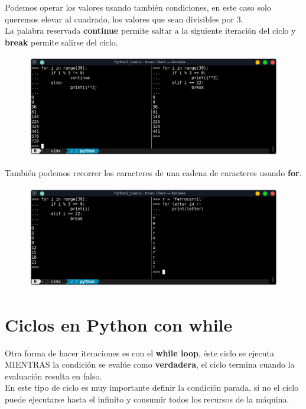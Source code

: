 \documentclass{article}
\begin{document}
Podemos operar los valores usando también condiciones, en este caso solo
queremos elevar al cuadrado, los valores que sean divisibles por 3.\\

La palabra reservada \textbf{continue} permite saltar a la siguiente iteración
del ciclo y \textbf{break} permite salirse del ciclo.

\begin{figure}[h!]
  \centering
  \includegraphics[scale=0.75]{./Pictures/021_for.png}
\end{figure}

También podemos recorrer los caracteres de una cadena de caracteres usando
\textbf{for}.

\newpage

\begin{figure}[h!]
  \centering
  \includegraphics[scale=0.75]{./Pictures/022_for_string.png}
\end{figure}


\section{Ciclos en Python con while}%
Otra forma de hacer iteraciones es con el \textbf{while loop}, éste ciclo se
ejecuta MIENTRAS la condición se evalúe como \textbf{verdadera}, el ciclo
termina cuando la evaluación resulta en falso.\\

En este tipo de ciclo es muy importante definir la condición parada, si no el
ciclo puede ejecutarse hasta el infinito y consumir todos los recursos de la
máquina.\\
\end{document}
